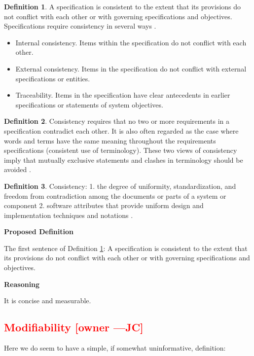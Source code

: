 \documentclass[letterpaper,cleveref]{lipics-v2019}
\newcommand{\authornote}[3]{\textcolor{#1}{[#3 ---#2]}}
\newcommand{\authornote}[3]{}
\newcommand{\jc}[1]{\authornote{red}{JC}{#1}} %
\newcommand{\notdone}[1]{\textcolor{red}{#1}}
\theoremstyle{definition}
\newtheorem{defn}{Definition}
\begin{document}
\begin{defn}
\label{ConsistencySelected}
A specification is consistent to the extent that its provisions do not conflict
with each other or with governing specifications and objectives. Specifications
require consistency in several ways \citep{Boehm1984}.
\begin{itemize}
\item Internal consistency. Items within the specification do not conflict with
each other.
\item External consistency. Items in the specification do not conflict with
external specifications or entities.
\item Traceability. Items in the specification have clear antecedents in earlier
specifications or statements of system objectives.
\end{itemize}
\end{defn}
\begin{defn}
Consistency requires that no two or more requirements in a specification
contradict each other. It is also often regarded as the case where words and
terms have the same meaning throughout the requirements specifications
(consistent use of terminology). These two views of consistency imply that
mutually exclusive statements and clashes in terminology should be avoided
\citep{ZOWGHI2003}.
\end{defn}
\begin{defn}
Consistency: 1. the degree of uniformity, standardization, and freedom from
contradiction among the documents or parts of a system or component 2. software
attributes that provide uniform design and implementation techniques and
notations \citep{ISO/IEC/IEEE24765}.
\end{defn}

\noindent \textbf{Proposed Definition} 

The first sentence of Definition \ref{ConsistencySelected}: A specification is
consistent to the extent that its provisions do not conflict with each other or
with governing specifications and objectives.

\noindent \textbf{Reasoning}

It is concise and measurable.

\subsection{\notdone{Modifiability} \jc{owner}}

Here we do seem to have a simple, if somewhat uninformative, definition:
\end{document}

